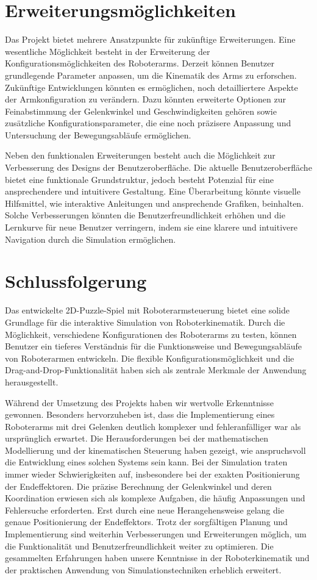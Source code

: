 \documentclass[12pt]{article}
\begin{document}
    \section{Erweiterungsmöglichkeiten}
    Das Projekt bietet mehrere Ansatzpunkte für zukünftige Erweiterungen. Eine wesentliche Möglichkeit besteht
    in der Erweiterung der Konfigurationsmöglichkeiten des Roboterarms. Derzeit können Benutzer grundlegende
    Parameter anpassen, um die Kinematik des Arms zu erforschen. Zukünftige Entwicklungen könnten es ermöglichen,
    noch detailliertere Aspekte der Armkonfiguration zu verändern. Dazu könnten erweiterte Optionen zur
    Feinabstimmung der Gelenkwinkel und Geschwindigkeiten gehören sowie zusätzliche Konfigurationsparameter,
    die eine noch präzisere Anpassung und Untersuchung der Bewegungsabläufe ermöglichen.

    Neben den funktionalen Erweiterungen besteht auch die Möglichkeit zur Verbesserung des Designs der
    Benutzeroberfläche. Die aktuelle Benutzeroberfläche bietet eine funktionale Grundstruktur, jedoch besteht
    Potenzial für eine ansprechendere und intuitivere Gestaltung. Eine Überarbeitung könnte visuelle Hilfsmittel,
    wie interaktive Anleitungen und ansprechende Grafiken, beinhalten. Solche Verbesserungen könnten die
    Benutzerfreundlichkeit erhöhen und die Lernkurve für neue Benutzer verringern, indem sie eine klarere
    und intuitivere Navigation durch die Simulation ermöglichen.


    \section{Schlussfolgerung}
    Das entwickelte 2D-Puzzle-Spiel mit Roboterarmsteuerung bietet eine solide Grundlage für die interaktive
    Simulation von Roboterkinematik. Durch die Möglichkeit, verschiedene Konfigurationen des Roboterarms zu
    testen, können Benutzer ein tieferes Verständnis für die Funktionsweise und Bewegungsabläufe von Roboterarmen
    entwickeln. Die flexible Konfigurationsmöglichkeit und die Drag-and-Drop-Funktionalität haben sich als
    zentrale Merkmale der Anwendung herausgestellt.

    Während der Umsetzung des Projekts haben wir wertvolle Erkenntnisse gewonnen. Besonders hervorzuheben
    ist, dass die Implementierung eines Roboterarms mit drei Gelenken deutlich komplexer und fehleranfälliger
    war als ursprünglich erwartet. Die Herausforderungen bei der mathematischen Modellierung und der
    kinematischen Steuerung haben gezeigt, wie anspruchsvoll die Entwicklung eines solchen Systems sein kann.
    Bei der Simulation traten immer wieder Schwierigkeiten auf, insbesondere bei der exakten Positionierung der
    Endeffektoren. Die präzise Berechnung der Gelenkwinkel und deren Koordination erwiesen sich als komplexe
    Aufgaben, die häufig Anpassungen und Fehlersuche erforderten. Erst durch eine neue Herangehensweise gelang
    die genaue Positionierung der Endeffektors. Trotz der sorgfältigen Planung und Implementierung sind weiterhin
    Verbesserungen und Erweiterungen möglich, um die Funktionalität und Benutzerfreundlichkeit weiter zu
    optimieren. Die gesammelten Erfahrungen haben unsere Kenntnisse in der Roboterkinematik und der praktischen
    Anwendung von Simulationstechniken erheblich erweitert.
\end{document}
